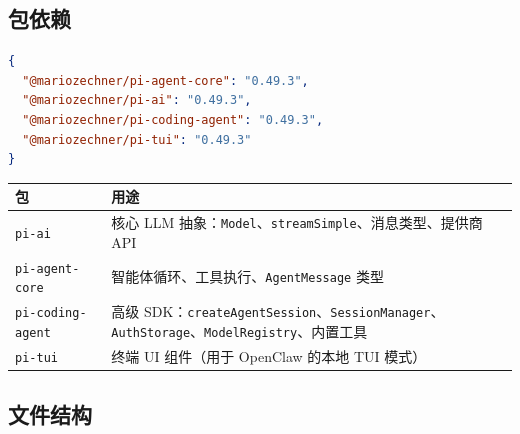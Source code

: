 \subsection{包依赖}


\begin{lstlisting}[language=json]
{
  "@mariozechner/pi-agent-core": "0.49.3",
  "@mariozechner/pi-ai": "0.49.3",
  "@mariozechner/pi-coding-agent": "0.49.3",
  "@mariozechner/pi-tui": "0.49.3"
}
\end{lstlisting}



\begin{table}[h]
\centering
\small
\begin{tabular}{|l|l|}
\hline
包 & 用途 \\
\hline
\texttt{pi-ai} & 核心 LLM 抽象：\texttt{Model}、\texttt{streamSimple}、消息类型、提供商 API \\
\hline
\texttt{pi-agent-core} & 智能体循环、工具执行、\texttt{AgentMessage} 类型 \\
\hline
\texttt{pi-coding-agent} & 高级 SDK：\texttt{createAgentSession}、\texttt{SessionManager}、\texttt{AuthStorage}、\texttt{ModelRegistry}、内置工具 \\
\hline
\texttt{pi-tui} & 终端 UI 组件（用于 OpenClaw 的本地 TUI 模式） \\
\hline
\end{tabular}
\end{table}



\subsection{文件结构}


